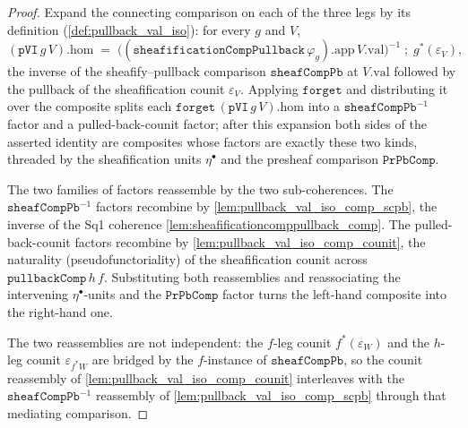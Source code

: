 \begin{proof}
  \leanok
  Expand the connecting comparison on each of the three legs by its definition
  (\cref{def:pullback_val_iso}): for every \(g\) and \(V\),
  \[
    (\mathtt{pVI}\,g\,V).\mathrm{hom} \;=\;
      \bigl((\mathtt{sheafificationCompPullback}\,\varphi_g).\mathrm{app}\,V.\mathrm{val}\bigr)^{-1}
        \;\mathbin{;}\; g^{*}(\varepsilon_V),
  \]
  the inverse of the sheafify--pullback comparison \(\mathtt{sheafCompPb}\) at \(V.\mathrm{val}\)
  followed by the pullback of the sheafification counit \(\varepsilon_V\). Applying
  \(\mathtt{forget}\) and distributing it over the composite splits each
  \(\mathtt{forget}\,(\mathtt{pVI}\,g\,V).\mathrm{hom}\) into a \(\mathtt{sheafCompPb}^{-1}\) factor
  and a pulled-back-counit factor; after this expansion both sides of the asserted identity are
  composites whose factors are exactly these two kinds, threaded by the sheafification units
  \(\eta^\bullet\) and the presheaf comparison \(\mathtt{PrPbComp}\).

  The two families of factors reassemble by the two sub-coherences. The
  \(\mathtt{sheafCompPb}^{-1}\) factors recombine by \cref{lem:pullback_val_iso_comp_scpb}, the
  inverse of the Sq1 coherence \cref{lem:sheafificationcomppullback_comp}. The pulled-back-counit
  factors recombine by \cref{lem:pullback_val_iso_comp_counit}, the naturality
  (pseudofunctoriality) of the sheafification counit across \(\mathtt{pullbackComp}\,h\,f\).
  Substituting both reassemblies and reassociating the intervening \(\eta^\bullet\)-units and the
  \(\mathtt{PrPbComp}\) factor turns the left-hand composite into the right-hand one.

  The two reassemblies are not independent: the \(f\)-leg counit \(f^{*}(\varepsilon_W)\) and the
  \(h\)-leg counit \(\varepsilon_{f^{*}W}\) are bridged by the \(f\)-instance of
  \(\mathtt{sheafCompPb}\), so the counit reassembly of \cref{lem:pullback_val_iso_comp_counit}
  interleaves with the \(\mathtt{sheafCompPb}^{-1}\) reassembly of
  \cref{lem:pullback_val_iso_comp_scpb} through that mediating comparison.
\end{proof}

